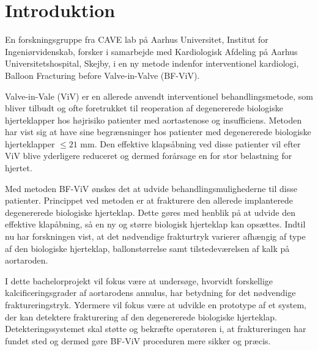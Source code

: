 \chapter{Introduktion}

En forskningsgruppe fra CAVE lab på Aarhus Universitet, Institut for Ingeniørvidenskab, forsker i samarbejde med Kardiologisk Afdeling på Aarhus Universitetshospital, Skejby, i en ny metode indenfor interventionel kardiologi, Balloon Fracturing before Valve-in-Valve (BF-ViV). 

Valve-in-Vale (ViV) er en allerede anvendt interventionel behandlingsmetode, som bliver tilbudt og ofte foretrukket til reoperation af degenererede biologiske hjerteklapper hos højrisiko patienter med aortastenose og insufficiens. Metoden har vist sig at have sine begrænsninger hos patienter med degenererede biologiske hjerteklapper $\leq21$ mm. Den effektive klapsåbning ved disse patienter vil efter ViV blive yderligere reduceret og dermed forårsage en for stor belastning for hjertet.

Med metoden BF-ViV ønskes det at udvide behandlingsmulighederne til disse patienter. Princippet ved metoden er at frakturere den allerede implanterede degenererede biologiske hjerteklap. Dette gøres med henblik på at udvide den effektive klapåbning, så en ny og større biologisk hjerteklap kan opsættes. Indtil nu har forskningen vist, at det nødvendige frakturtryk varierer afhængig af type af den biologiske hjerteklap, ballonstørrelse samt tilstedeværelsen af kalk på aortaroden.  

I dette bachelorprojekt vil fokus være at undersøge, hvorvidt forskellige kalcificeringsgrader af aortarodens annulus, har betydning for det nødvendige fraktureringstryk. Ydermere vil fokus være at udvikle en prototype af et system, der kan detektere frakturering af den degenererede biologiske hjerteklap. Detekteringssystemet skal støtte og bekræfte operatøren i, at fraktureringen har fundet sted og dermed gøre BF-ViV proceduren mere sikker og præcis.     



      

